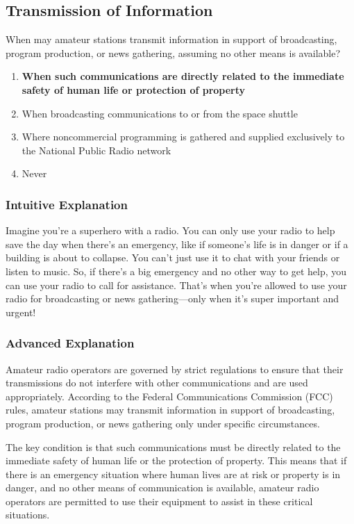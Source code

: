 \subsection{Transmission of Information}\label{T1D09}

\begin{tcolorbox}[colback=gray!10!white,colframe=black!75!black,title=T1D09]
When may amateur stations transmit information in support of broadcasting, program production, or news gathering, assuming no other means is available?
\begin{enumerate}[label=\Alph*)]
    \item \textbf{When such communications are directly related to the immediate safety of human life or protection of property}
    \item When broadcasting communications to or from the space shuttle
    \item Where noncommercial programming is gathered and supplied exclusively to the National Public Radio network
    \item Never
\end{enumerate}
\end{tcolorbox}

\subsubsection{Intuitive Explanation}
Imagine you're a superhero with a radio. You can only use your radio to help save the day when there's an emergency, like if someone's life is in danger or if a building is about to collapse. You can't just use it to chat with your friends or listen to music. So, if there's a big emergency and no other way to get help, you can use your radio to call for assistance. That's when you're allowed to use your radio for broadcasting or news gathering—only when it's super important and urgent!

\subsubsection{Advanced Explanation}
Amateur radio operators are governed by strict regulations to ensure that their transmissions do not interfere with other communications and are used appropriately. According to the Federal Communications Commission (FCC) rules, amateur stations may transmit information in support of broadcasting, program production, or news gathering only under specific circumstances. 

The key condition is that such communications must be directly related to the immediate safety of human life or the protection of property. This means that if there is an emergency situation where human lives are at risk or property is in danger, and no other means of communication is available, amateur radio operators are permitted to use their equipment to assist in these critical situations.

